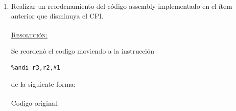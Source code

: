 \documentclass[a4paper,11pt]{article}
\begin{document}
\begin{enumerate}
\paragraph{Ejecuci\'on del programa con forwarding:}


\paragraph{}
Se ejecutan X ciclos y X instrucciones , con x instrucciones en el  pipeline al finalizar.

\paragraph{}
\begin{center}
$CPI = x ciclos / x  instrucciones = x$
\end{center}

\paragraph{} 

Se contaron un total de x stalls, divididos en las siguientes categor\'ias:

\begin{itemize}
\item x stalls de control (x\% de todos los ciclos)
\item x stalls correspondientes a la instruccion trap (x\% de todos los ciclos)
\item x stalls RAW (Read After Write) (x\% de todos los ciclos).
\end{itemize}


\newpage

\item	Realizar un reordenamiento del c\'odigo assembly implementado en el \'item anterior que disminuya el CPI.

\paragraph{}
\underline{\textsc{Resoluci\'on:}}

Se reorden\'o el codigo moviendo a la instrucci\'on 

\begin{verbatim}
%andi r3,r2,#1 
\end{verbatim}


de la siguiente forma:

\paragraph{}
Codigo original:


\end{enumerate}
\end{document}
